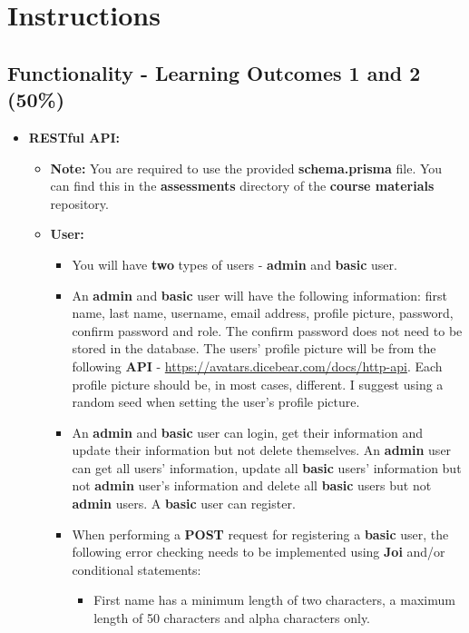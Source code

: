 \documentclass{article}
\begin{document}
\section*{Instructions}

\subsection*{Functionality - Learning Outcomes 1 and 2 (50\%)}
\begin{itemize} 

\item \textbf{RESTful API:}
	\begin{itemize}
		\item \textbf{Note:} You are required to use the provided \textbf{schema.prisma} file. You can find this in the \textbf{assessments} directory of the \textbf{course materials} repository.
		\item \textbf{User:}
		\begin{itemize}
			\item You will have \textbf{two} types of users - \textbf{admin} and \textbf{basic} user.
			\item An \textbf{admin} and \textbf{basic} user will have the following information: first name, last name, username, email address, profile picture, password, confirm password and role. The confirm password does not need to be stored in the database. The users' profile picture will be from the following \textbf{API} - \href{https://avatars.dicebear.com/docs/http-api}{https://avatars.dicebear.com/docs/http-api}. Each profile picture should be, in most cases, different. I suggest using a random seed when setting the user's profile picture.
			\item An \textbf{admin} and \textbf{basic} user can login, get their information and update their information but not delete themselves. An \textbf{admin} user can get all users' information, update all \textbf{basic} users' information but not \textbf{admin} user's information and delete all \textbf{basic} users but not \textbf{admin} users. A \textbf{basic} user can register.
			\item When performing a \textbf{POST} request for registering a \textbf{basic} user, the following error checking needs to be implemented using \textbf{Joi} and/or conditional statements:
			\begin{itemize}
				\item First name has a minimum length of two characters, a maximum length of 50 characters and alpha characters only.

\end{itemize}
\end{itemize}
\end{itemize}
\end{itemize}
\end{document}

